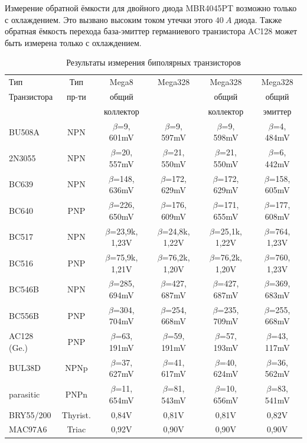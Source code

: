 Измерение обратной ёмкости для двойного диода MBR4045PT возможно только с охлаждением. 
Это вызвано высоким током утечки этого \(40~A\) диода. Также обратная ёмкость перехода база-эмиттер 
германиевого транзистора AC128 может быть измерена только с охлаждением.

\begin{table}[H]
  \begin{center}
    \begin{tabular}{| l | c | c | c | c | c |}
    \hline
             Тип & Тип & Mega8           & Mega328        & Mega328         & Mega328 \\
Транзистора     & пр-ти     & общий         &                & общий         & общий \\
            &     & коллектор      &                & коллектор       & эмиттер \\
    \hline
    \hline
BU508A      & NPN & \(\beta\)=9, 601mV      &  \(\beta\)=9, 597mV    &   \(\beta\)=9, 598mV    & \(\beta\)=4, 484mV \\
    \hline
2N3055      & NPN & \(\beta\)=20, 557mV     &  \(\beta\)=21, 550mV   &   \(\beta\)=21, 550mV   & \(\beta\)=6, 442mV \\
    \hline
BC639       & NPN & \(\beta\)=148, 636mV    &  \(\beta\)=172, 629mV  &   \(\beta\)=172, 629mV  & \(\beta\)=158, 605mV \\
    \hline
BC640       & PNP & \(\beta\)=226, 650mV    &  \(\beta\)=176, 609mV  &   \(\beta\)=171, 655mV  & \(\beta\)=177, 608mV \\
    \hline
BC517       & NPN & \(\beta\)=23,9k, 1,23V  &  \(\beta\)=24,8k, 1,22V&   \(\beta\)=25,1k, 1,22V & \(\beta\)=764, 1,23V \\
    \hline
BC516       & PNP & \(\beta\)=75,9k, 1,21V  &  \(\beta\)=76,2k, 1,20V&   \(\beta\)=76,2k, 1,20V & \(\beta\)=760, 1,23V \\
    \hline
BC546B      & NPN & \(\beta\)=285, 694mV    &  \(\beta\)=427, 687mV  &   \(\beta\)=427, 687mV   & \(\beta\)=369, 683mV \\
    \hline
BC556B      & PNP & \(\beta\)=304, 704mV    &  \(\beta\)=254, 668mV  &   \(\beta\)=235, 709mV   & \(\beta\)=255, 668mV \\
    \hline
AC128 (Ge.) & PNP & \(\beta\)=63, 191mV     &  \(\beta\)=59, 191mV   &   \(\beta\)=57, 193mV    & \(\beta\)=43, 117mV \\
    \hline
BUL38D      & NPNp & \(\beta\)=37, 627mV    &  \(\beta\)=41, 617mV  &   \(\beta\)=40, 624mV     & \(\beta\)=36, 562mV \\
parasitic   & PNPn & \(\beta\)=11, 654mV    &  \(\beta\)=81, 543mV  &   \(\beta\)=10, 656mV     & \(\beta\)=83, 541mV \\
    \hline
BRY55/200   & Thyrist. &  0,84V     &  0,81V         &   0,81V          &  0,82V \\
    \hline
MAC97A6     & Triac    &  0,92V     &  0,90V         &   0,90V          &  0,90V \\
    \hline
    \end{tabular}
  \end{center}
  \caption{Результаты измерения биполярных транзисторов}
  \label{tab:bipolar} 
\end{table}

